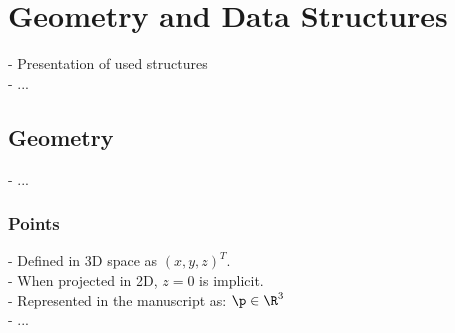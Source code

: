 \section{Geometry and Data Structures}
\label{sec:introduction_geometry-datastructures}
- Presentation of used structures \\
- ...

\subsection{Geometry}
- ...

\subsubsection{Points}
- Defined in 3D space as $\left( x, y, z \right)^T$. \\
- When projected in 2D, $z = 0$ is implicit. \\
- Represented in the manuscript as: $\p \in \R^3$ \\
- ...

